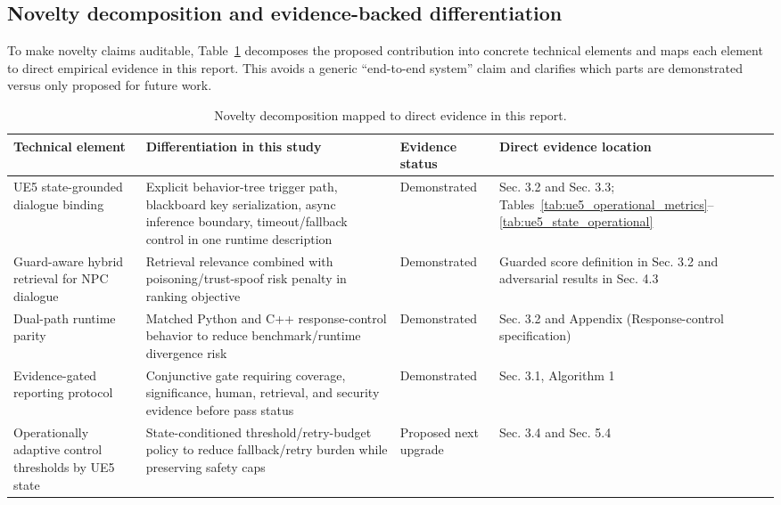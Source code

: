 ﻿\documentclass[a4paper,12pt]{article}
\begin{document}
\subsection{Novelty decomposition and evidence-backed differentiation}
To make novelty claims auditable, Table~\ref{tab:novelty_decomposition} decomposes the proposed contribution into concrete technical elements and maps each element to direct empirical evidence in this report. This avoids a generic ``end-to-end system'' claim and clarifies which parts are demonstrated versus only proposed for future work.

\begin{table}[t]
\centering
\caption{Novelty decomposition mapped to direct evidence in this report.}
\label{tab:novelty_decomposition}
\begingroup
\footnotesize
\setlength{\tabcolsep}{3.5pt}
\begin{tabular}{p{}p{}p{}p{}}
\toprule
Technical element & Differentiation in this study & Evidence status & Direct evidence location \\
\midrule
UE5 state-grounded dialogue binding & Explicit behavior-tree trigger path, blackboard key serialization, async inference boundary, timeout/fallback control in one runtime description & Demonstrated & Sec. 3.2 and Sec. 3.3; Tables~\ref{tab:ue5_operational_metrics}--\ref{tab:ue5_state_operational} \\
Guard-aware hybrid retrieval for NPC dialogue & Retrieval relevance combined with poisoning/trust-spoof risk penalty in ranking objective & Demonstrated & Guarded score definition in Sec. 3.2 and adversarial results in Sec. 4.3 \\
Dual-path runtime parity & Matched Python and C++ response-control behavior to reduce benchmark/runtime divergence risk & Demonstrated & Sec. 3.2 and Appendix (Response-control specification) \\
Evidence-gated reporting protocol & Conjunctive gate requiring coverage, significance, human, retrieval, and security evidence before pass status & Demonstrated & Sec. 3.1, Algorithm 1 \\
Operationally adaptive control thresholds by UE5 state & State-conditioned threshold/retry-budget policy to reduce fallback/retry burden while preserving safety caps & Proposed next upgrade & Sec. 3.4 and Sec. 5.4 \\
\bottomrule
\end{tabular}
\endgroup
\end{table}
\end{document}
